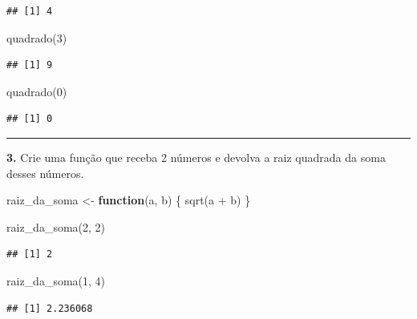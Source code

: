 \documentclass[
]{book}
\newenvironment{Shaded}{\begin{snugshade}}{\end{snugshade}}
\newcommand{\ControlFlowTok}[1]{\textcolor[rgb]{0.13,0.29,0.53}{\textbf{#1}}}
\newcommand{\DecValTok}[1]{\textcolor[rgb]{0.00,0.00,0.81}{#1}}
\newcommand{\FunctionTok}[1]{\textcolor[rgb]{0.00,0.00,0.00}{#1}}
\newcommand{\NormalTok}[1]{#1}
\newcommand{\OtherTok}[1]{\textcolor[rgb]{0.56,0.35,0.01}{#1}}
\newcommand{\SpecialCharTok}[1]{\textcolor[rgb]{0.00,0.00,0.00}{#1}}
\begin{document}
\begin{verbatim}
## [1] 4
\end{verbatim}

\begin{Shaded}
\begin{Highlighting}[]
\FunctionTok{quadrado}\NormalTok{(}\DecValTok{3}\NormalTok{)}
\end{Highlighting}
\end{Shaded}

\begin{verbatim}
## [1] 9
\end{verbatim}

\begin{Shaded}
\begin{Highlighting}[]
\FunctionTok{quadrado}\NormalTok{(}\DecValTok{0}\NormalTok{)}
\end{Highlighting}
\end{Shaded}

\begin{verbatim}
## [1] 0
\end{verbatim}

\begin{center}\rule{0.5\linewidth}{0.5pt}\end{center}

\textbf{3.} Crie uma função que receba 2 números e devolva a raiz quadrada da soma desses números.

\begin{Shaded}
\begin{Highlighting}[]
\NormalTok{raiz\_da\_soma }\OtherTok{\textless{}{-}} \ControlFlowTok{function}\NormalTok{(a, b) \{}
  \FunctionTok{sqrt}\NormalTok{(a }\SpecialCharTok{+}\NormalTok{ b)}
\NormalTok{\}}

\FunctionTok{raiz\_da\_soma}\NormalTok{(}\DecValTok{2}\NormalTok{, }\DecValTok{2}\NormalTok{)}
\end{Highlighting}
\end{Shaded}

\begin{verbatim}
## [1] 2
\end{verbatim}

\begin{Shaded}
\begin{Highlighting}[]
\FunctionTok{raiz\_da\_soma}\NormalTok{(}\DecValTok{1}\NormalTok{, }\DecValTok{4}\NormalTok{)}
\end{Highlighting}
\end{Shaded}

\begin{verbatim}
## [1] 2.236068
\end{verbatim}
\end{document}
